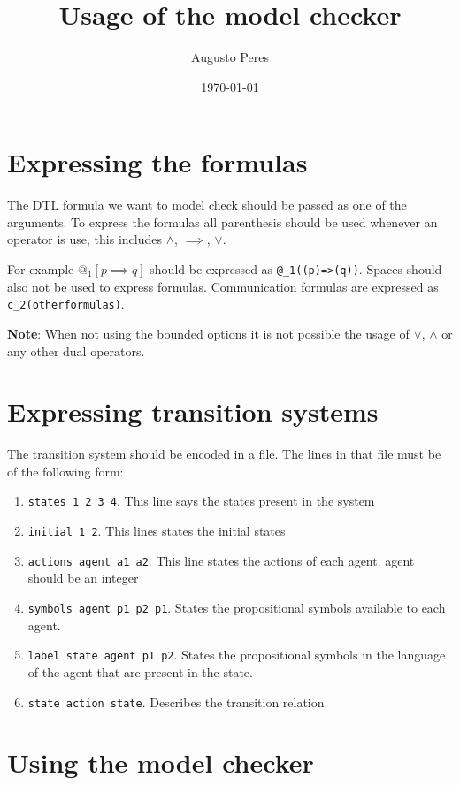 \documentclass[11pt]{article}
\author{Augusto Peres}
\date{\today}
\title{Usage of the model checker}
\begin{document}
\maketitle


\section{Expressing the formulas}
\label{sec:org953ebfe}

The DTL formula we want to model check should be passed as one of the arguments.
To express the formulas all parenthesis should be used whenever an operator is
use, this includes \(\wedge\), \(\implies\), \(\vee\).

For example \(@_1[p \implies q]\) should be expressed as \texttt{@\_1((p)=>(q))}. Spaces
should also not be used to express formulas. Communication formulas are
expressed as \texttt{c\_2(otherformulas)}.

\textbf{Note}: When not using the bounded options it is not possible the usage of
 \(\vee\), \(\wedge\) or any other dual operators.

\section{Expressing transition systems}
\label{sec:org82f870d}

The transition system should be encoded in a file. The lines in that file must
be of the following form:

\begin{enumerate}
\item \texttt{states 1 2 3 4}. This line says the states present in the system
\item \texttt{initial 1 2}. This lines states the initial states
\item \texttt{actions agent a1 a2}. This line states the actions of each agent. agent
should be an integer
\item \texttt{symbols agent p1 p2 p1}. States the propositional symbols available to each
agent.
\item \texttt{label state agent p1 p2}. States the propositional symbols in the language
of the agent that are present in the state.
\item \texttt{state action state}. Describes the transition relation.
\end{enumerate}

\section{Using the model checker}
\label{sec:org6e540a1}
\end{document}
